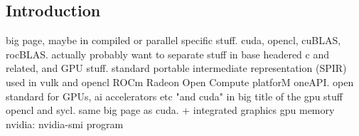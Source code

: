 
\subsection{Introduction}

big page, maybe in compiled or parallel specific stuff. cuda, opencl, cuBLAS, rocBLAS. actually probably want to separate stuff in base headered c and related, and GPU stuff.
standard portable intermediate representation (SPIR) used in vulk and opencl
ROCm Radeon Open Compute platforM
oneAPI. open standard for GPUs, ai accelerators etc
"and cuda" in big title of the gpu stuff
opencl and sycl. same big page as cuda.
+ integrated graphics
gpu memory
nvidia: nvidia-smi program


